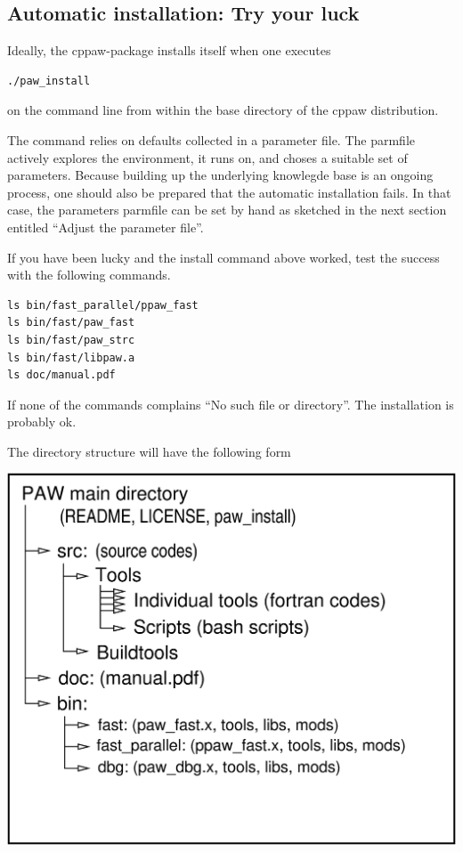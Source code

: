 \documentclass[final,12pt,makeidx,DIV=calc]{article}
\begin{document}
{{{{{{\subsection{Automatic installation: Try your luck}
Ideally, the cppaw-package installs itself when one executes
\begin{verbatim}
./paw_install
\end{verbatim}
on the command line from within the base directory of the cppaw
distribution.

The command relies on defaults collected in a parameter file. The
parmfile actively explores the environment, it runs on, and choses a
suitable set of parameters. Because building up the underlying
knowlegde base is an ongoing process, one should also be prepared that
the automatic installation fails. In that case, the parameters
parmfile can be set by hand as sketched in the next section entitled
``Adjust the parameter file''.

If you have been lucky and the install command above worked, test the
success with the following commands.
\begin{verbatim}
ls bin/fast_parallel/ppaw_fast
ls bin/fast/paw_fast
ls bin/fast/paw_strc
ls bin/fast/libpaw.a
ls doc/manual.pdf
\end{verbatim}
If none of the commands complains ``No such file or directory''. The
installation is probably ok. 


The directory structure will have the following form
\begin{center}
\includegraphics[width=0.8\linewidth]{Figs/PAWdirtree/pawdirtree.eps}
\end{center}

}}}}}}
\end{document}

